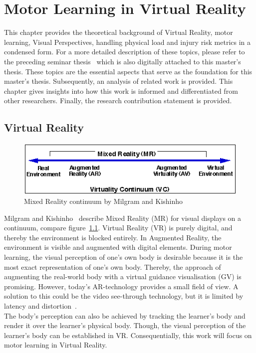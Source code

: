 \chapter{Motor Learning in Virtual Reality}
\label{chapter:theoretical_background}
This chapter provides the theoretical background of Virtual Reality, motor learning, Visual Perspectives, handling physical load and injury risk metrics in a condensed form. For a more detailed description of these topics, please refer to the preceding seminar thesis~\cite{seminarThesis} which is also digitally attached to this master's thesis. These topics are the essential aspects that serve as the foundation for this master's thesis. Subsequently, an analysis of related work is provided. This chapter gives insights into how this work is informed and differentiated from other researchers. Finally, the research contribution statement is provided.

\section{Virtual Reality}
\label{section:mixed_reality}
\begin{figure}[H]
	\centering
	\includegraphics[width=\textwidth]{figures/milgram_continuum.png}
	\caption[Mixed Reality continuum by Milgram et al.]{Mixed Reality continuum by Milgram and Kishinho~\cite{mrcontinuum}}
	\label{fig:mrCont}
\end{figure}
Milgram and Kishinho~\cite{mrcontinuum} describe Mixed Reality (MR) for visual displays on a continuum, compare figure~\ref{fig:mrCont}. Virtual Reality (VR) is purely digital, and thereby the environment is blocked entirely. In Augmented Reality, the environment is visible and augmented with digital elements. During motor learning, the visual perception of one's own body is desirable because it is the most exact representation of one's own body. Thereby, the approach of augmenting the real-world body with a virtual guidance visualisation (GV) is promising. However, today's AR-technology provides a small field of view. A solution to this could be the video see-through technology, but it is limited by latency and distortion~\cite{max}.\\
The body's perception can also be achieved by tracking the learner's body and render it over the learner's physical body. Though, the visual perception of the learner's body can be established in VR. Consequentially, this work will focus on motor learning in Virtual Reality.

